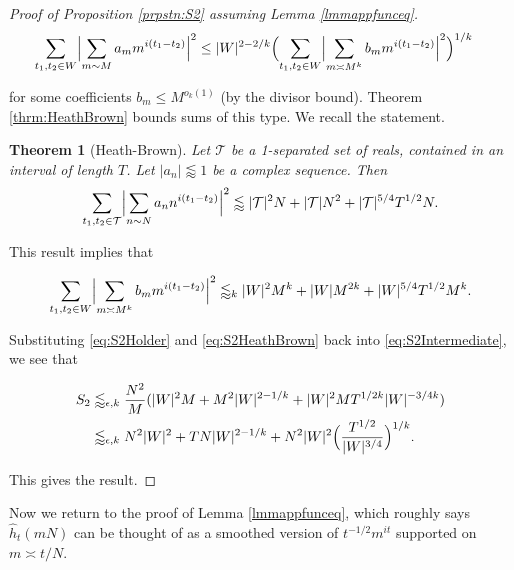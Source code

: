 \documentclass{amsart}
\theoremstyle{plain}
\newtheorem*{thrm*}{Theorem}
\numberwithin{equation}{section}
\begin{document}
\begin{proof}[Proof of Proposition \ref{prpstn:S2} assuming Lemma \ref{lmmappfunceq}]
\begin{align}
\sum_{t_1,t_2\in W}\Bigl|\sum_{m \sim M} a_m m^{i(t_1-t_2)}\Bigr|^2&\le |W|^{2-2/k}\Bigl(\sum_{t_1,t_2\in W}\Bigl|\sum_{m\asymp M^k}b_m m^{i(t_1-t_2)}\Bigr|^{2}\Bigr)^{1/k}
\label{eq:S2Holder}
\end{align}

for some coefficients $b_m\le  M^{o_k(1)}$ (by the divisor bound).   Theorem \ref{thrm:HeathBrown} bounds sums of this type.   We recall the statement.

\begin{thrm*}[Heath-Brown]
Let $\mathcal{T}$ be a 1-separated set of reals, contained in an interval of length $T$. Let $|a_n|\lessapprox 1$ be a complex sequence. Then
\[
\sum_{t_1,t_2\in \mathcal{T}}\Bigl|\sum_{n\sim N} a_n n^{i(t_1-t_2)}\Bigr|^2\lessapprox |\mathcal{T}|^2N+|\mathcal{T}|N^2+|\mathcal{T}|^{5/4}T^{1/2}N.
\]
\end{thrm*}

This result implies that

\begin{equation}
\sum_{t_1,t_2\in W}\Bigl|\sum_{m\asymp M^k}b_m m^{i(t_1-t_2)}\Bigr|^{2}\lessapprox_k |W|^2M^k+|W|M^{2k}+|W|^{5/4}T^{1/2}M^k.
\label{eq:S2HeathBrown}
\end{equation}

Substituting \eqref{eq:S2Holder} and \eqref{eq:S2HeathBrown} back into \eqref{eq:S2Intermediate}, we see that 

\begin{align}
S_{2}&\lessapprox_{\epsilon,k}\frac{N^2}{M}(|W|^{2}M+M^2|W|^{2-1/k}+|W|^2 M T^{1/2k}|W|^{-3/4k})\nonumber\\
&\lessapprox_{\epsilon,k} N^2 |W|^2+T N |W|^{2-1/k}+N^2|W|^2 \Bigl(\frac{T^{1/2}}{|W|^{3/4}}\Bigr)^{1/k}.
\label{eq:S2Bound}
\end{align}

This gives the result.
\end{proof}


Now we return to the proof of Lemma \ref{lmmappfunceq}, which roughly says $\widehat{h}_t(mN)$ can be thought of as a smoothed version of $t^{-1/2}m^{it}$ supported on $m\asymp t/N$.
\end{document}
